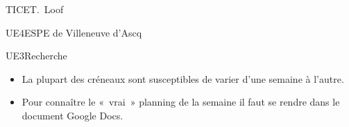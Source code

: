 \documentclass[varwidth=29cm,border=7pt]{standalone}
\begin{document}
\begin{planning}
\begin{module}{TICE}{T.~Loof}
    \end{module}
    \begin{module}{UE4}{ESPE de Villeneuve d'Ascq}
    \end{module}
    \begin{module}{UE3}{Recherche}
    \end{module}
  \end{planning}

  \begin{itemize}
    \item La plupart des créneaux sont susceptibles de varier d'une semaine à l'autre.
    \item Pour connaître le « vrai » planning de la semaine il faut se rendre dans le document Google Docs.
  \end{itemize}
\end{document}
